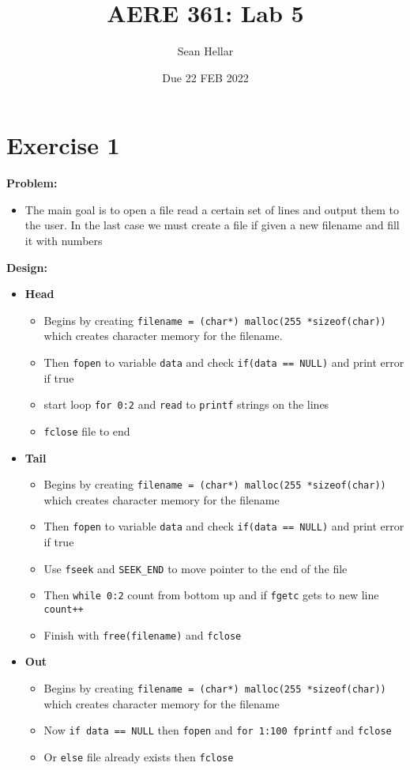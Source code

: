 \documentclass{article}
\title{AERE 361: Lab 5}
\date{Due 22 FEB 2022}
\author{Sean Hellar}
\begin{document}
\maketitle
\newpage

\section{Exercise 1}

\textbf{Problem:}
\begin{itemize}
\item{The main goal is to open a file read a certain set of lines and output them to the user. In the last case we must create a file if given a new filename and fill it with numbers}
\end{itemize}

\textbf{Design:}
\begin{itemize}
\item{\textbf{Head}}
  \begin{itemize}
  \item{Begins by creating \texttt{filename = (char*) malloc(255 *sizeof(char))} which creates character memory for the filename.}
  \item{Then \texttt{fopen} to variable \texttt{data} and check \texttt{if(data == NULL)} and print error if true}
  \item{start loop \texttt{for 0:2} and \texttt{read} to \texttt{printf} strings on the lines}
  \item{\texttt{fclose} file to end}
  \end{itemize}
\item{\textbf{Tail}}
  \begin{itemize}
  \item{Begins by creating \texttt{filename = (char*) malloc(255 *sizeof(char))} which creates character memory for the filename}
  \item{Then \texttt{fopen} to variable \texttt{data} and check \texttt{if(data == NULL)} and print error if true}
  \item{Use \texttt{fseek} and \texttt{SEEK\_END} to move pointer to the end of the file}
  \item{Then \texttt{while 0:2} count from bottom up and if \texttt{fgetc} gets to new line \texttt{count++}}
  \item{Finish with \texttt{free(filename)} and \texttt{fclose}}
  \end{itemize}
\item{\textbf{Out}}
  \begin{itemize}
  \item{Begins by creating \texttt{filename = (char*) malloc(255 *sizeof(char))} which creates character memory for the filename}
  \item{Now \texttt{if data == NULL} then \texttt{fopen} and \texttt{for 1:100 fprintf} and \texttt{fclose}}
  \item{Or \texttt{else} file already exists then \texttt{fclose}}
  \end{itemize}
\end{itemize}
\end{document}
